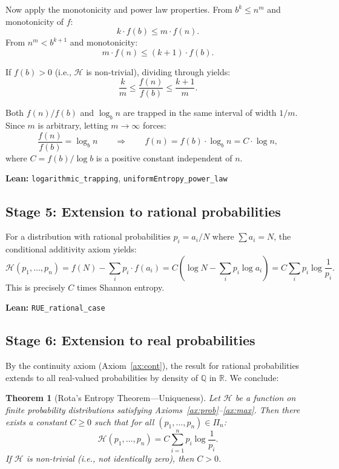 \documentclass[12pt,a4paper]{article}
\newtheorem{theorem}{Theorem}[section]
\theoremstyle{definition}
\newcommand{\lean}[1]{\texttt{#1}}
\newcommand{\Hfunc}{\mathcal{H}}
\begin{document}
Now apply the monotonicity and power law properties.  From $b^k \leq n^m$
and monotonicity of $f$:
\[
  k \cdot f(b) \leq m \cdot f(n).
\]
From $n^m < b^{k+1}$ and monotonicity:
\[
  m \cdot f(n) \leq (k+1) \cdot f(b).
\]

If $f(b) > 0$ (i.e., $\Hfunc$ is non-trivial), dividing through yields:
\[
  \frac{k}{m} \leq \frac{f(n)}{f(b)} \leq \frac{k+1}{m}.
\]

Both $f(n)/f(b)$ and $\log_b n$ are trapped in the same interval of
width $1/m$.  Since $m$ is arbitrary, letting $m \to \infty$ forces:
\[
  \frac{f(n)}{f(b)} = \log_b n
  \qquad\Longrightarrow\qquad
  f(n) = f(b) \cdot \log_b n = C \cdot \log n,
\]
where $C = f(b) / \log b$ is a positive constant independent of $n$.

\medskip\noindent
\textbf{Lean:} \lean{logarithmic\_trapping},
\lean{uniformEntropy\_power\_law}

\subsection{Stage 5: Extension to rational probabilities}

For a distribution with rational probabilities
$p_i = a_i / N$ where $\sum a_i = N$, the conditional additivity axiom
yields:
\[
  \Hfunc(p_1, \dots, p_n) = f(N) - \sum_{i} p_i \cdot f(a_i)
  = C \left(\log N - \sum_{i} p_i \log a_i\right)
  = C \sum_{i} p_i \log \frac{1}{p_i}.
\]
This is precisely $C$ times Shannon entropy.

\medskip\noindent
\textbf{Lean:} \lean{RUE\_rational\_case}

\subsection{Stage 6: Extension to real probabilities}

By the continuity axiom (Axiom~\ref{ax:cont}), the result for rational
probabilities extends to all real-valued probabilities by density of
$\mathbb{Q}$ in $\mathbb{R}$.  We conclude:

\begin{theorem}[Rota's Entropy Theorem---Uniqueness]
\label{thm:ret}
Let $\Hfunc$ be a function on finite probability distributions
satisfying Axioms~\ref{ax:prob}--\ref{ax:max}.  Then there exists a
constant $C \geq 0$ such that for all $(p_1, \dots, p_n) \in \Pi_n$:
\[
  \Hfunc(p_1, \dots, p_n) = C \sum_{i=1}^{n} p_i \log \frac{1}{p_i}.
\]
If $\Hfunc$ is non-trivial (i.e., not identically zero), then $C > 0$.
\end{theorem}
\end{document}
